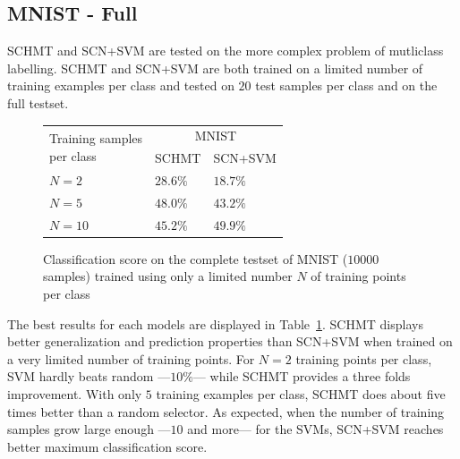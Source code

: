\documentclass{article}
\begin{document}
  \vspace{-5pt}
  \subsection{MNIST - Full}
    \label{subsec:Exps/MNIST - Full}
    \vspace{-5pt}
		SCHMT and SCN+SVM are tested on the more complex problem of mutliclass labelling. SCHMT and SCN+SVM are both trained on a limited number of training examples per class and tested on $20$ test samples per class and on the full testset.

		\begin{figure}
      \hspace{40pt}
      \begin{tabular}{  |p{2.5cm}
                        |p{1.5cm}
                        |p{1.5cm}|}
        \hline
        \multirow{2}{*}{\parbox[t]{2.5cm}{Training samples \\ per class}} & \multicolumn{2}{c|}{MNIST}\\
        \cline{2-3}
                & SCHMT & SCN+SVM \\
        \hline
        $N = 2$     & $\mathbf{28.6}\%$  & $18.7\%$   \\
        \hline
        $N = 5$     & $\mathbf{48.0\%}$ & $43.2\%$  \\
        \hline
        $N = 10$    & $45.2\%$  & $\mathbf{49.9\%}$  \\       
        \hline
      \end{tabular}
      \caption{Classification score on the complete testset of MNIST ($10000$ samples) trained using only a limited number $N$ of training points per class}
      \label{tab:Exp2 results}
      \vspace{-15pt}
    \end{figure}
		
    The best results for each models are displayed in Table~\ref{tab:Exp2 results}. SCHMT displays better generalization and prediction properties than SCN+SVM when trained on a very limited number of training points. For $N=2$ training points per class, SVM hardly beats random ---\ie $10\%$--- while SCHMT provides a three folds improvement. With only $5$ training examples per class, SCHMT does about five times better than a random selector. As expected, when the number of training samples grow large enough ---\ie $10$ and more--- for the SVMs, SCN+SVM reaches better maximum classification score.
		
\end{document}
